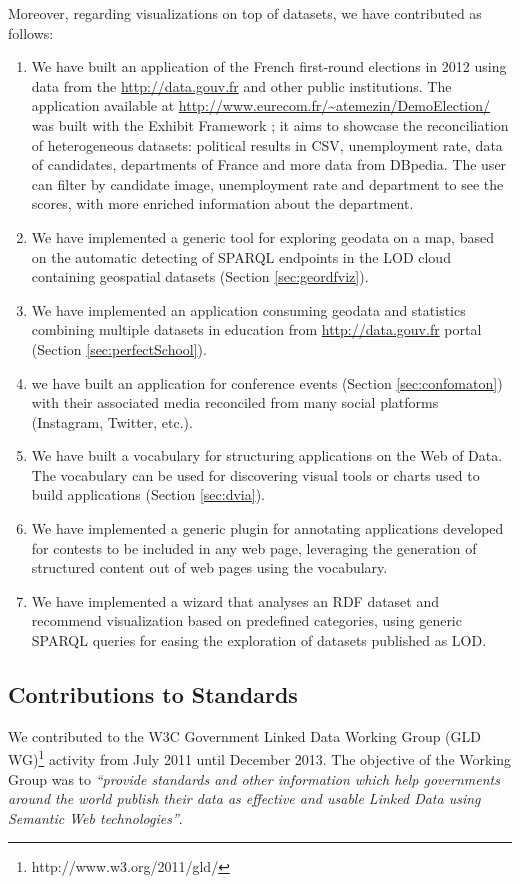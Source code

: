 Moreover, regarding visualizations on top of datasets, we have contributed as follows:
\begin{enumerate}
 \item We have built an application of the French first-round elections in 2012 using data from the \url{http://data.gouv.fr} and other public institutions. The application available at \url{http://www.eurecom.fr/~atemezin/DemoElection/} was built with the Exhibit Framework \cite{exhibit2007}; it aims to showcase the reconciliation of heterogeneous datasets: political results in CSV, unemployment rate, data of candidates, departments of France and more data from DBpedia. The user can filter by candidate image, unemployment rate and department to see the scores, with more enriched information about the department.
 \item We have implemented a generic tool for exploring geodata on a map, based on the automatic detecting of SPARQL endpoints in the LOD cloud containing geospatial datasets (Section \ref{sec:geordfviz}).
 \item We have implemented an application consuming geodata and statistics combining multiple datasets in education from \url{http://data.gouv.fr} portal (Section \ref{sec:perfectSchool}).
 \item we have built an application for conference events (Section \ref{sec:confomaton}) with their associated media reconciled from many social platforms (Instagram, Twitter, etc.).
 \item We have built a vocabulary for structuring applications on the Web of Data. The vocabulary can be used for discovering visual tools or charts used to build applications (Section \ref{sec:dvia}).
 \item We have implemented a generic plugin for annotating applications developed for contests to be included in any web page, leveraging  the generation of structured content out of web pages using the vocabulary.
 \item We have implemented a wizard that analyses an RDF dataset and recommend visualization based on predefined categories, using generic SPARQL queries for easing the exploration of datasets published as LOD.
\end{enumerate}

\subsection{Contributions to Standards}
\label{sec:contrib-standard}
We contributed to the W3C Government Linked Data Working Group (GLD WG)\footnote{http://www.w3.org/2011/gld/} activity from July 2011 until December 2013. The objective of the Working Group was to \textit{``provide standards and other information which help governments around the world publish their data as effective and usable Linked Data using Semantic Web technologies''}.

